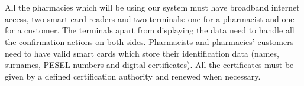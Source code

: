 \chapter{   }


All the pharmacies which will be using our system must have broadband internet access, two smart card readers and two terminals: one for a pharmacist and one for a customer. The terminals apart from displaying the data need to handle all the confirmation actions on both sides. \newline
Pharmacists and pharmacies’ customers need to have valid smart cards which store their identification data (names, surnames, PESEL numbers and digital certificates). All the certificates must be given by a defined certification authority and renewed when necessary.


\textbf{}

